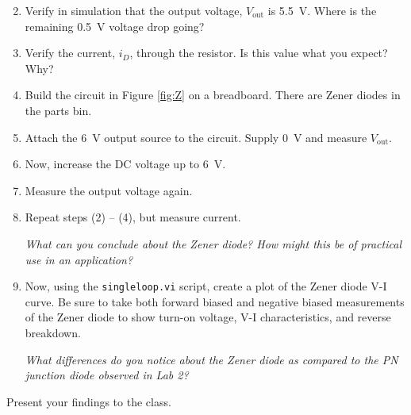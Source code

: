 \documentclass[12pt]{../manual}
\begin{document}
\begin{enumerate}
\setcounter{enumi}{1}
\item Verify in simulation that the output voltage, $V_\mathrm{out}$ is \SI{5.5}{\volt}. Where is the remaining \SI{0.5}{\volt} voltage drop going?
\item Verify the current, $i_D$, through the resistor. Is this value what you expect? Why?
\item Build the circuit in Figure \ref{fig:Z} on a breadboard. There are Zener diodes in the parts bin.
\item Attach the \SI{6}{\volt} output source to the circuit. Supply \SI{0}{\volt} and measure $V_\mathrm{out}$.
\item Now, increase the DC voltage up to \SI{6}{\volt}.
\item Measure the output voltage again.
\item Repeat steps (2) -- (4), but measure current.

{\it What can you conclude about the Zener diode? How might this be of practical use in an application?}

\item Now, using the {\tt singleloop.vi} script, create a plot of the Zener diode V-I curve. Be sure to take both forward biased and negative biased measurements of the Zener diode to show turn-on voltage, V-I characteristics, and reverse breakdown.

{\it What differences do you notice about the Zener diode as compared to the PN junction diode observed in Lab 2?}
\end{enumerate}

Present your findings to the class.
\end{document}
